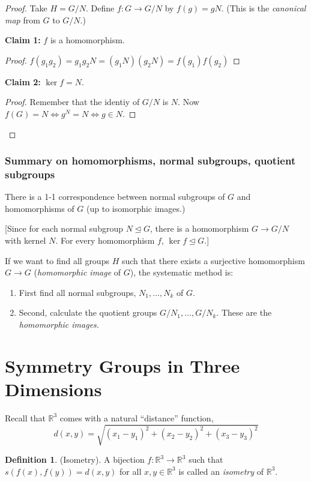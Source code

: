 \documentclass{article}
\theoremstyle{definition}
\newtheorem*{definition}{Definition}
\newcommand{\reals}{\mathbb{R}}
\begin{document}
  \begin{proof}
    Take $H=G/N$. Define $f:G \rightarrow G/N$ by $f(g)=gN$. (This is the \textit{canonical map} from $G$ to $G/N$.)

    \textbf{Claim 1:} $f$ is a homomorphism.

    \begin{proof}
      $f(g_1g_2)=g_1g_2N=(g_1N)(g_2N)=f(g_1)f(g_2)$
    \end{proof}

    \textbf{Claim 2:} $\ker f = N$.
    \begin{proof}
      Remember that the identiy of $G/N$ is $N$. Now $f(G)=N \iff g^N = N \iff g \in N$.
    \end{proof}
  \end{proof}

  \subsubsection*{Summary on homomorphisms, normal subgroups, quotient subgroups}
  There is a 1-1 correspondence between normal subgroups of $G$ and homomorphisms
  of $G$ (up to isomorphic images.)

  [Since for each normal subgroup $N \trianglelefteq G$, there is a homomorphism $G \rightarrow G/N$ with kernel $N$. For every homomorphism $f$, $\ker f \trianglelefteq G$.]

  If we want to find all groups $H$ such that there exists a surjective homomorphism
  $G \rightarrow G$ (\textit{homomorphic image} of $G$), the systematic method is:
  \begin{enumerate}
    \item First find all normal subgroups, $N_1, \dots, N_k$ of $G$.
    \item Second, calculate the quotient groups $G/N_1, \dots, G/N_k$. These are the \textit{homomorphic images.}
  \end{enumerate}

  \section{Symmetry Groups in Three Dimensions}

  Recall that $\reals^3$  comes with a natural ``distance'' function,
  \[
    d(x,y)=\sqrt{(x_1 - y_1)^2 + (x_2 - y_2)^2 + (x_3 - y_3)^2}
  \]

  \begin{definition}
    (Isometry). A bijection $f:\reals^3 \rightarrow \reals^3$ such that $s(f(x),f(y))=d(x,y)$ for all $x,y \in \reals^3$ is called an \textit{isometry} of $\reals^3$.
  \end{definition}
\end{document}
